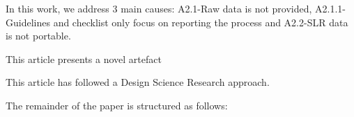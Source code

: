 \documentclass{article}
\begin{document}
In this work, we address 3 main causes: A2.1-Raw data is not provided, A2.1.1-Guidelines and checklist only focus on reporting the process and A2.2-SLR data is not portable. 
    
This article presents a novel artefact
    

    

      
This article has followed a Design Science Research approach.

The remainder of the paper is structured as follows: 

    
      


\end{document}
